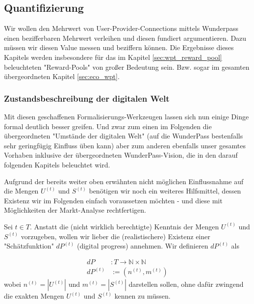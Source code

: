 \subsection{Quantifizierung}
\label{sec:eco_zahlen}

Wir wollen den Mehrwert von User-Provider-Connections mittels Wunderpass einen bezifferbaren Mehrwert verleihen und diesen fundiert argumentieren. Dazu müssen wir diesen Value messen und beziffern können. Die Ergebnisse dieses Kapitels werden insbesondere für das im Kapitel \ref{sec:wpt_reward_pool} beleuchteten "Reward-Pools" von großer Bedeutung sein. Bzw. sogar im gesamten übergeordneten Kapitel \ref{sec:eco_wpt}.


\subsubsection{Zustandsbeschreibung der digitalen Welt}
\label{sec:eco_zahlen_zustand_digitalisierung}

Mit diesen geschaffenen Formalisierungs-Werkzeugen lassen sich nun einige Dinge formal deutlich besser greifen. Und zwar zum einen im Folgenden die übergeordneten "Umstände der digitalen Welt" (auf die WunderPass bestenfalls sehr geringfügig Einfluss üben kann) aber zum anderen ebenfalls unser gesamtes Vorhaben inklusive der übergeordneten WunderPass-Vision, die in den darauf folgenden Kapitels beleuchtet wird. 

\vspace{0.3cm}

Aufgrund der bereits weiter oben erwähnten nicht möglichen Einflussnahme auf die Mengen $U^{(t)}$ und $S^{(t)}$ benötigen wir noch ein weiteres Hilfsmittel, dessen Existenz wir im Folgenden einfach voraussetzen möchten - und diese mit Möglichkeiten der Markt-Analyse rechtfertigen.

\vspace{0.3cm}

\begin{Assumption}\label{assumptionOrakel}

Sei $t \in T$. Anstatt die (nicht wirklich berechtigte) Kenntnis der Mengen $U^{(t)}$ und $S^{(t)}$ vorzugeben, wollen wir lieber die (realistischere) Existenz einer "Schätzfunktion" $dP^{(t)}$ (digital progress) annehmen. Wir definieren $dP^{(t)}$ als

\begin{align*}
dP &: T \rightarrow \mathbb{N} \times \mathbb{N}  \\
dP^{(t)} &:= \left(n^{(t)}, m^{(t)}\right)
\end{align*}
wobei $n^{(t)} = |U^{(t)}|$ und $m^{(t)} = |S^{(t)}|$ darstellen sollen, ohne dafür zwingend die exakten Mengen $U^{(t)}$ und $S^{(t)}$ kennen zu müssen.

\end{Assumption}

